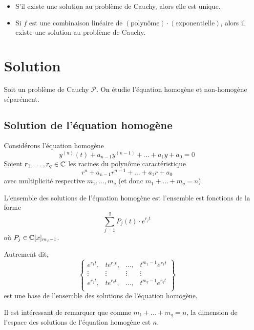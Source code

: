 \begin{mytheo}\InsertTheoremBreak
	\begin{itemize}
		\item S'il existe une solution au problème de Cauchy, alors elle est unique.
		\item Si $f$ est une combinaison linéaire de $(\mathrm{polynôme})\cdot(\mathrm{exponentielle})$,
			alors il existe une solution au problème de Cauchy.
	\end{itemize}
\end{mytheo}

\section{Solution}

Soit un problème de Cauchy $\mathcal{P}$. On étudie l'équation homogène et non-homogène séparément.

\subsection{Solution de l'équation homogène}
\begin{mytheo}
	Considérons l'équation homogène
	\[ y^{(n)}(t) + a_{n-1}y^{(n-1)} + \dots + a_1y + a_0 = 0 \]
	Soient $r_1, \dots, r_q \in \mathbb{C}$ les racines du polynôme caractéristique
	\[ r^n + a_{n-1}r^{n-1} + \dots + a_1r + a_0 \]
	avec multiplicité respective $m_1, \dots, m_q$ (et donc $m_1 + \dots + m_q = n$).

	L'ensemble des solutions de l'équation homogène est l'ensemble est fonctions de la forme
	\[ \sum_{j=1}^{q} P_j(t) \cdot e^{r_j t} \]
	où $P_j \in \mathbb{C}[x]_{m_j -1}$.

	Autrement dit,
	\[ \begin{Bmatrix}
		e^{r_1t}, & te^{r_1t}, & \dots, & t^{m_1-1}e^{r_1t}\\
		\vdots & \vdots & \vdots & \vdots\\
		e^{r_qt}, & te^{r_qt}, & \dots, & t^{m_q-1}e^{r_qt}\\
	\end{Bmatrix} \]
	est une base de l'ensemble des solutions de l'équation homogène.

	Il est intéressant de remarquer que comme $m_1 + \dots + m_q = n$,
	la dimension de l'espace des solutions de l'équation homogène est $n$.
\end{mytheo}


